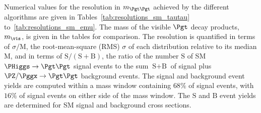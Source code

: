 Numerical values for the resolution in $m_{\Pgt\Pgt}$ achieved by the different algorithms are given in Tables~\ref{tab:resolutions_sm_tautau} to~\ref{tab:resolutions_sm_emu}.
The mass of the visible $\Pgt$ decay products, $m_{\vis}$, is given in the tables for comparison.
The resolution is quantified in terms of $\sigma/\textrm{M}$, the root-mean-square (RMS) $\sigma$ of each distribution relative to its median $\textrm{M}$,
and in terms of $\textrm{S}/(\textrm{S} + \textrm{B})$, the ratio of the number $\textrm{S}$ of SM $\PHiggs \to \Pgt\Pgt$ signal events to the sum $\textrm{S} + \textrm{B}$ of signal plus $\PZ/\Pggx \to \Pgt\Pgt$ background events.
The signal and background event yields are computed within a mass window containing $68\%$ of signal events,
with $16\%$ of signal events on either side of the mass window.
The $\textrm{S}$ and $\textrm{B}$ event yields are determined for SM signal and background cross sections.

